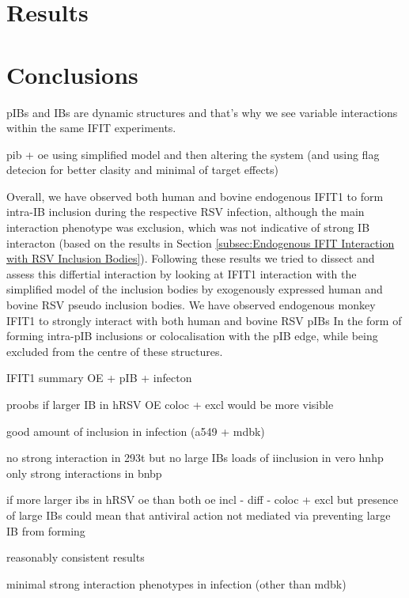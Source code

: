 \section{Results} \label{sec:Results-Chapter4}



\section{Conclusions} \label{sec:Conclusions-Chapter4}
pIBs and IBs are dynamic structures and that's why we see variable interactions within the same IFIT experiments.

pib + oe
using simplified model and then altering the system (and using flag detecion for better clasity and minimal of target effects)



Overall, we have observed both human and bovine endogenous IFIT1 to form intra-IB inclusion during the respective RSV infection, although the main interaction phenotype was exclusion, which was not indicative of strong IB interacton (based on the results in Section \ref{subsec:Endogenous IFIT Interaction with RSV Inclusion Bodies}). Following these results we tried to dissect and assess this differtial interaction by looking at IFIT1 interaction with the simplified model of the inclusion bodies by exogenously expressed human and bovine RSV pseudo inclusion bodies. We have observed endogenous monkey IFIT1 to strongly interact with both human and bovine RSV pIBs In the form of forming intra-pIB inclusions or colocalisation with the pIB edge, while being excluded from the centre of these structures. 


IFIT1 summary OE + pIB + infecton

proobs if larger IB in hRSV OE coloc + excl would be more visible


good amount of inclusion in infection (a549 + mdbk)

no strong interaction in 293t but no large IBs
loads of iinclusion in vero hnhp
only strong interactions in bnbp

if more larger ibs in hRSV oe than both oe incl -  diff - coloc + excl
but presence of large IBs could mean that antiviral action not mediated via preventing large IB from forming

reasonably consistent results

minimal strong interaction phenotypes in infection (other than mdbk)

